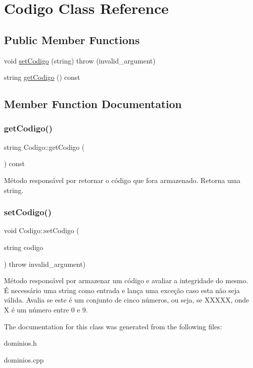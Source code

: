 \hypertarget{classCodigo}{}\section{Codigo Class Reference}
\label{classCodigo}
\subsection*{Public Member Functions}
\begin{DoxyCompactItemize}
\item 
void \hyperlink{classCodigo_a863651a26dd7112dccced628aa96d86e}{set\+Codigo} (string)  throw (invalid\+\_\+argument)
\item 
string \hyperlink{classCodigo_ac263b3f7ff4f995fa72ad9101f1a8533}{get\+Codigo} () const
\end{DoxyCompactItemize}


\subsection{Member Function Documentation}
\mbox{\label{classCodigo_ac263b3f7ff4f995fa72ad9101f1a8533}} 
\subsubsection{\texorpdfstring{get\+Codigo()}{getCodigo()}}
{\footnotesize\ttfamily string Codigo\+::get\+Codigo (\begin{DoxyParamCaption}{ }\end{DoxyParamCaption}) const\hspace{0.3cm}{\ttfamily [inline]}}

Método responsável por retornar o código que fora armazenado. Retorna uma string. \mbox{\label{classCodigo_a863651a26dd7112dccced628aa96d86e}} 
\subsubsection{\texorpdfstring{set\+Codigo()}{setCodigo()}}
{\footnotesize\ttfamily void Codigo\+::set\+Codigo (\begin{DoxyParamCaption}\item[{string}]{codigo }\end{DoxyParamCaption}) throw  invalid\+\_\+argument) }

Método responsável por armazenar um código e avaliar a integridade do mesmo. É necessário uma string como entrada e lança uma exceção caso esta não seja válida. Avalia se este é um conjunto de cinco números, ou seja, se X\+X\+X\+XX, onde X é um número entre 0 e 9. 

The documentation for this class was generated from the following files\+:\begin{DoxyCompactItemize}
\item 
dominios.\+h\item 
dominios.\+cpp\end{DoxyCompactItemize}
